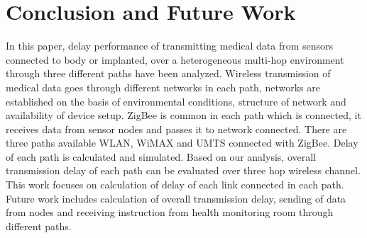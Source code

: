 \documentclass[11pt, conference, compsocconf, onecolumn]{IEEEtran}
\begin{document}
\section{Conclusion and Future Work}
In this paper, delay performance of transmitting medical data from sensors connected to body or implanted, over a heterogeneous multi-hop environment through three different paths have been analyzed. Wireless transmission of medical data goes through different networks in each path, networks are established on the basis of environmental conditions, structure of network and availability of device setup. ZigBee is common in each path which is connected, it receives data from sensor nodes and passes it to network connected. There are three paths available WLAN, WiMAX and UMTS connected with ZigBee. Delay of each path is calculated and simulated. Based on our analysis, overall transmission delay of each path can be evaluated over three hop wireless channel. This work focuses on calculation of delay of each link connected in each path. Future work includes calculation of overall transmission delay, sending of data from nodes and receiving instruction from health monitoring room through different paths.
\end{document}
